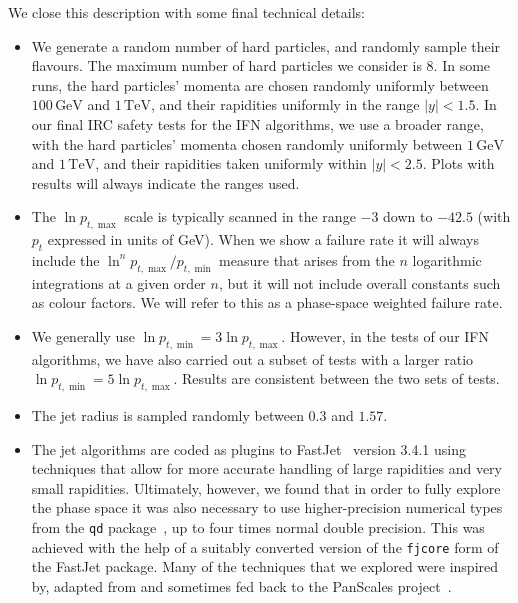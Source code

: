 \documentclass[nofootinbib,twocolumn,preprintnumbers,superscriptaddress,aps]{revtex4-2}
\newcommand{\GeV}{\,\text{GeV}}
\newcommand{\TeV}{\,\text{TeV}}
\newcommand{\lnptmin}{\ln p_{t,\min}}
\newcommand{\lnptmax}{\ln p_{t,\max}}
\newcommand{\ptmin}{p_{t,\min}}
\newcommand{\ptmax}{p_{t,\max}}
\newcommand{\logbook}[2]{}
\begin{document}
We close this description with some final technical details:
%
\begin{itemize}
\item We generate a random number of hard particles, and randomly
  sample their flavours.
  The maximum number of hard particles we consider is $8$.
  In some runs, the hard particles' momenta are chosen randomly
  uniformly between $100\GeV$ and $1\TeV$, and their rapidities
  uniformly in the range $|y|<1.5$.
  In our final IRC safety tests for the IFN algorithms, we use a
  broader range, with the hard particles' momenta chosen randomly
  uniformly between $1\GeV$ and $1\TeV$, and their rapidities taken
  uniformly within $|y|<2.5$.
  Plots with results will always indicate the ranges used.

\item The $\lnptmax$ scale is typically scanned in the range $-3$ down
  to $-42.5$ (with $p_t$ expressed in units of GeV).
  When we show a failure rate it will always include the
  $\ln^n \ptmax/\ptmin$ measure that arises from the $n$ logarithmic
  integrations at a given order $n$, but it will not include overall
  constants such as colour factors.
  We will refer to this as a phase-space weighted failure rate.

\item We generally use $\lnptmin = 3\lnptmax$.
  However, in the tests of our IFN algorithms, we have also carried
  out a subset of tests with a larger ratio $\lnptmin = 5\lnptmax$.
  Results are consistent between the two sets of tests.
  \logbook{9e5e8eb}{
  see in IRSafety-prec/results-2023-04-12/neutralisers:
  res-antikt-hp-jadea2-as-4-nhard-6-1GeV-15-lnptratio-5.0.le.lnpt.le.-9-ddreal.dat
  res-antikt-hp-jadea2-as-4-nhard-6-1GeV-26-lnptratio-5.0.le.lnpt.le.-15-qdreal.dat
  res-antikt-hp-jadea2-as-4-nhard-6-1GeV-9-lnptratio-5.0.le.lnpt.le.-3-double.dat
  res-antikt-hp-maxscale-as-4-nhard-6-1GeV-15-lnptratio-5.0.le.lnpt.le.-9-ddreal.dat
  res-antikt-hp-maxscale-as-4-nhard-6-1GeV-26-lnptratio-5.0.le.lnpt.le.-15-qdreal.dat
  res-antikt-hp-maxscale-as-4-nhard-6-1GeV-9-lnptratio-5.0.le.lnpt.le.-3-double.dat
  }
  
\item The jet radius is sampled randomly between $0.3$ and $1.57$.

\item The jet algorithms are coded as plugins to 
  FastJet~\cite{Cacciari:2011ma} version 3.4.1 using techniques that allow for more
  accurate handling of large rapidities and very small rapidities.
  Ultimately, however, we found that in order to fully explore the
  phase space it was also necessary to use higher-precision numerical
  types from the \texttt{qd} package~\cite{hida2000quad}, up to four
  times normal double precision.
  This was achieved with the help of a suitably converted version of
  the \texttt{fjcore} form of the FastJet package.
  Many of the techniques that we explored were inspired by, adapted
  from and sometimes fed back to the PanScales
  project~\cite{Dasgupta:2020fwr,Hamilton:2020rcu,vanBeekveld:2022ukn}.
  

\end{itemize}
\end{document}
